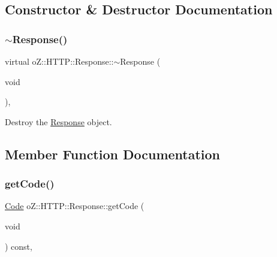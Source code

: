 \subsection{Constructor \& Destructor Documentation}
\mbox{\label{classo_z_1_1_h_t_t_p_1_1_response_a0dd4953fa89d6f7c8fbe6fdc6a9ca50e}} 
\subsubsection{\texorpdfstring{$\sim$Response()}{~Response()}}
{\footnotesize\ttfamily virtual o\+Z\+::\+H\+T\+T\+P\+::\+Response\+::$\sim$\+Response (\begin{DoxyParamCaption}\item[{void}]{ }\end{DoxyParamCaption})\hspace{0.3cm}{\ttfamily [virtual]}, {\ttfamily [default]}}



Destroy the \mbox{\hyperlink{classo_z_1_1_h_t_t_p_1_1_response}{Response}} object. 



\subsection{Member Function Documentation}
\mbox{\label{classo_z_1_1_h_t_t_p_1_1_response_aa2191a167fe53e8f0a8c2e64393cede0}} 
\subsubsection{\texorpdfstring{getCode()}{getCode()}}
{\footnotesize\ttfamily \mbox{\hyperlink{namespaceo_z_1_1_h_t_t_p_acd43703151305f79b1e2f42e98ee8199}{Code}} o\+Z\+::\+H\+T\+T\+P\+::\+Response\+::get\+Code (\begin{DoxyParamCaption}\item[{void}]{ }\end{DoxyParamCaption}) const\hspace{0.3cm}{\ttfamily [inline]}, {\ttfamily [noexcept]}}



